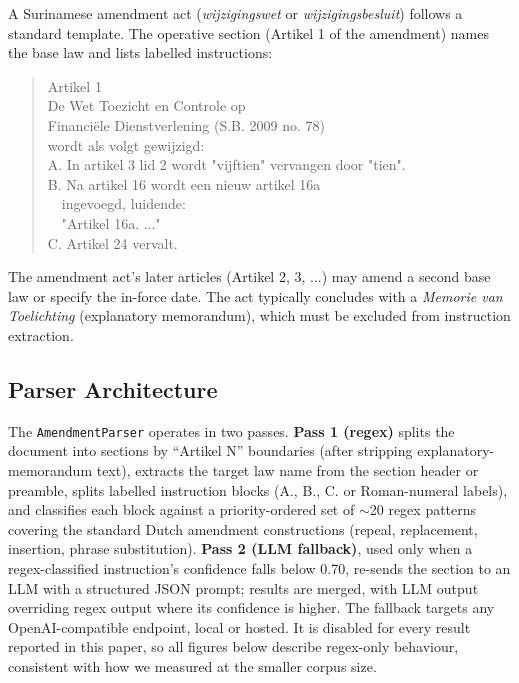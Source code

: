 \documentclass{IOS-Book-Article}
\begin{document}
A Surinamese amendment act (\emph{wijzigingswet} or \emph{wijzigingsbesluit}) follows a standard
template. The operative section (Artikel 1 of the amendment) names the base law and lists
labelled instructions:

\begin{quote}
\small\ttfamily
Artikel 1\\
De Wet Toezicht en Controle op\\
Financi\"{e}le Dienstverlening (S.B. 2009 no. 78)\\
wordt als volgt gewijzigd:\\[4pt]
A. In artikel 3 lid 2 wordt "vijftien" vervangen door "tien".\\
B. Na artikel 16 wordt een nieuw artikel 16a\\
\ \ ingevoegd, luidende:\\
\ \ "Artikel 16a. ..."\\
C. Artikel 24 vervalt.
\end{quote}

The amendment act's later articles (Artikel 2, 3, ...) may amend a second base law or
specify the in-force date. The act typically concludes with a \emph{Memorie van Toelichting}
(explanatory memorandum), which must be excluded from instruction extraction.

\subsection{Parser Architecture}

The \texttt{AmendmentParser} operates in two passes. \textbf{Pass 1 (regex)} splits the document into
sections by ``Artikel N'' boundaries (after stripping explanatory-memorandum text), extracts
the target law name from the section header or preamble, splits labelled instruction blocks
(A., B., C. or Roman-numeral labels), and classifies each block against a priority-ordered
set of $\sim$20 regex patterns covering the standard Dutch amendment constructions (repeal,
replacement, insertion, phrase substitution). \textbf{Pass 2 (LLM fallback)}, used only when a
regex-classified instruction's confidence falls below 0.70, re-sends the section to an LLM
with a structured JSON prompt; results are merged, with LLM output overriding regex output
where its confidence is higher. The fallback targets any OpenAI-compatible endpoint, local
or hosted. It is disabled for every result reported in this paper, so all figures below
describe regex-only behaviour, consistent with how we measured at the smaller corpus size.
\end{document}
